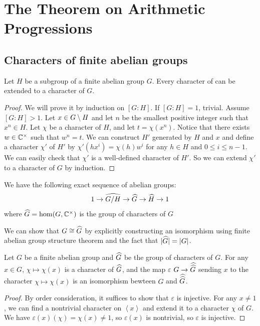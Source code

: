 \documentclass[15pt]{scrartcl}
\begin{document}
\section{The Theorem on Arithmetic Progressions}
\subsection{Characters of finite abelian groups}
\begin{theorem}
    Let $H$ be a subgroup of a finite abelian group $G$. Every character of can be extended to a character of $G$.
\end{theorem}
\begin{proof}
    We will prove it by induction on $[G:H]$. If $[G:H]=1$, trivial. Assume $[G:H]>1$. Let $x\in G\setminus H$ and let $n$ be the smallest positive integer such that $x^n\in H$. Let $\chi$ be a character of $H$, and let $t=\chi(x^n)$. Notice that there exists $w\in\mathbb C^\times$ such that $w^n=t$. We can construct $H'$ generated by $H$ and $x$ and define a character $\chi'$ of $H'$ by $\chi'(hx^i)=\chi(h)w^i$ for any $h\in H$ and $0\leq i \leq n-1$. We can easily check that $\chi'$ is a well-defined character of $H'$. So we can extend $\chi'$ to a character of $G$ by induction.
\end{proof}
\begin{corollary}
    We have the following exact sequence of abelian groups:
    \[1\to \widehat{G/H}\to \widehat{G}\to \widehat{H}\to 1\]  
    where $\widehat{G}=\hom(G,\mathbb C^\times)$ is the group of characters of $G$ 
\end{corollary}
\begin{corollary}
    We can show that $G\cong \widehat{G}$ by explicitly constructing an isomorphism using finite abelian group structure theorem and the fact that $|\widehat{G}|=|G|$.
\end{corollary}
\begin{proposition}
    Let $G$ be a finite abelian group and $\widehat{G}$ be the group of characters of $G$. For any $x\in G$, $\chi\mapsto \chi(x)$ is a character of $\widehat{G}$, and the map $\varepsilon$ $G\to \widehat{\widehat{G}}$ sending $x$ to the character $\chi\mapsto \chi(x)$ is an isomorphism bewteen $G$ and $\widehat{\widehat{G}}$.
\end{proposition}
\begin{proof}
    By order consideration, it suffices to show that $\varepsilon$ is injective. For any $x\neq 1$, we can find a nontrivial character on $\left\langle x\right\rangle$ and extend it to a character $\chi$ of $G$. We have $\varepsilon(x)(\chi)=\chi(x)\neq 1$, so $\varepsilon(x)$ is nontrivial, so $\varepsilon$ is injective.
\end{proof}
\end{document}
